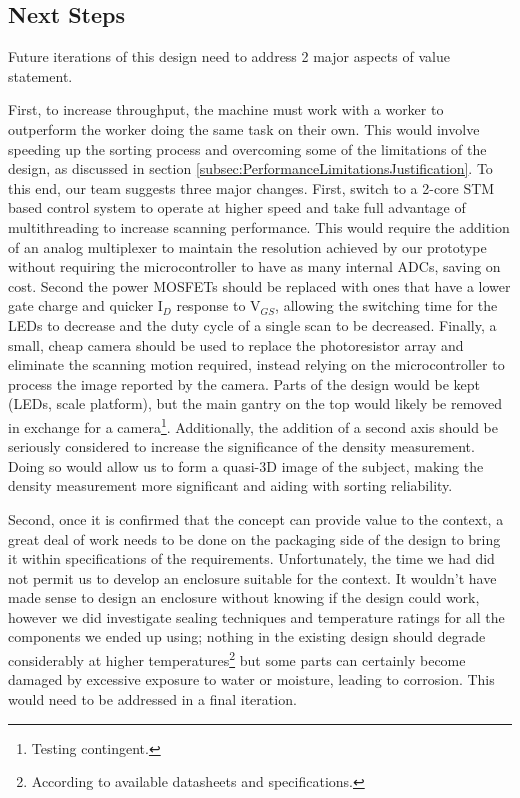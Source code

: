 \documentclass[12pt]{article}
\begin{document}
\begin{multicols*}{2}
        \subsection{Next Steps} \label{subsec:NextSteps}
            Future iterations of this design need to address 2 major aspects of value statement.
            
            First, to increase throughput, the machine must work with a worker to outperform the worker doing the same task on their own. This would involve speeding up the sorting process and overcoming some of the limitations of the design, as discussed in section \ref{subsec:PerformanceLimitationsJustification}. To this end, our team suggests three major changes. First, switch to a 2-core STM based control system to operate at higher speed and take full advantage of multithreading to increase scanning performance. This would require the addition of an analog multiplexer to maintain the resolution achieved by our prototype without requiring the microcontroller to have as many internal ADCs, saving on cost. Second the power MOSFETs should be replaced with ones that have a lower gate charge and quicker I$_D$ response to V$_{GS}$, allowing the switching time for the LEDs to decrease and the duty cycle of a single scan to be decreased. Finally, a small, cheap camera should be used to replace the photoresistor array and eliminate the scanning motion required, instead relying on the microcontroller to process the image reported by the camera. Parts of the design would be kept (LEDs, scale platform), but the main gantry on the top would likely be removed in exchange for a camera\footnote{Testing contingent.}. Additionally, the addition of a second axis should be seriously considered to increase the significance of the density measurement. Doing so would allow us to form a quasi-3D image of the subject, making the density measurement more significant and aiding with sorting reliability.
            
            Second, once it is confirmed that the concept can provide value to the context, a great deal of work needs to be done on the packaging side of the design to bring it within specifications of the requirements. Unfortunately, the time we had did not permit us to develop an enclosure suitable for the context. It wouldn't have made sense to design an enclosure without knowing if the design could work, however we did investigate sealing techniques and temperature ratings for all the components we ended up using; nothing in the existing design should degrade considerably at higher temperatures\footnote{According to available datasheets and specifications.} but some parts can certainly become damaged by excessive exposure to water or moisture, leading to corrosion. This would need to be addressed in a final iteration. 


\end{multicols*}
\end{document}
